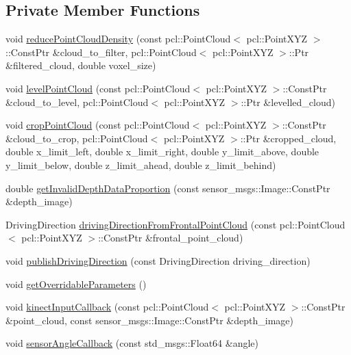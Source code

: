 \subsection*{\-Private \-Member \-Functions}
\begin{DoxyCompactItemize}
\item 
void \hyperlink{class_r_p_obstacle_avoidance_node_ae8af3d8cee91dae5e0c22c6ae1f29533}{reduce\-Point\-Cloud\-Density} (const pcl\-::\-Point\-Cloud$<$ pcl\-::\-Point\-X\-Y\-Z $>$\-::\-Const\-Ptr \&cloud\-\_\-to\-\_\-filter, pcl\-::\-Point\-Cloud$<$ pcl\-::\-Point\-X\-Y\-Z $>$\-::\-Ptr \&filtered\-\_\-cloud, double voxel\-\_\-size)
\item 
void \hyperlink{class_r_p_obstacle_avoidance_node_a92820408bb828c8361dd194b74f53202}{level\-Point\-Cloud} (const pcl\-::\-Point\-Cloud$<$ pcl\-::\-Point\-X\-Y\-Z $>$\-::\-Const\-Ptr \&cloud\-\_\-to\-\_\-level, pcl\-::\-Point\-Cloud$<$ pcl\-::\-Point\-X\-Y\-Z $>$\-::\-Ptr \&levelled\-\_\-cloud)
\item 
void \hyperlink{class_r_p_obstacle_avoidance_node_a07f936f129797f6651a8cbb94201e64d}{crop\-Point\-Cloud} (const pcl\-::\-Point\-Cloud$<$ pcl\-::\-Point\-X\-Y\-Z $>$\-::\-Const\-Ptr \&cloud\-\_\-to\-\_\-crop, pcl\-::\-Point\-Cloud$<$ pcl\-::\-Point\-X\-Y\-Z $>$\-::\-Ptr \&cropped\-\_\-cloud, double x\-\_\-limit\-\_\-left, double x\-\_\-limit\-\_\-right, double y\-\_\-limit\-\_\-above, double y\-\_\-limit\-\_\-below, double z\-\_\-limit\-\_\-ahead, double z\-\_\-limit\-\_\-behind)
\item 
double \hyperlink{class_r_p_obstacle_avoidance_node_acd37a3e07562bdb791f18c113f45fbd8}{get\-Invalid\-Depth\-Data\-Proportion} (const sensor\-\_\-msgs\-::\-Image\-::\-Const\-Ptr \&depth\-\_\-image)
\item 
\-Driving\-Direction \hyperlink{class_r_p_obstacle_avoidance_node_aa7f8e2b5949c3d6af800a80dfe3fc488}{driving\-Direction\-From\-Frontal\-Point\-Cloud} (const pcl\-::\-Point\-Cloud$<$ pcl\-::\-Point\-X\-Y\-Z $>$\-::\-Const\-Ptr \&frontal\-\_\-point\-\_\-cloud)
\item 
void \hyperlink{class_r_p_obstacle_avoidance_node_a8655bb559bb1482da40bbc2ed08b07a0}{publish\-Driving\-Direction} (const \-Driving\-Direction driving\-\_\-direction)
\item 
void \hyperlink{class_r_p_obstacle_avoidance_node_a2fb24e8a160ef9fed4813ca712c0fef0}{get\-Overridable\-Parameters} ()
\item 
void \hyperlink{class_r_p_obstacle_avoidance_node_a0df3266495f63da9a7d1069b1708986e}{kinect\-Input\-Callback} (const pcl\-::\-Point\-Cloud$<$ pcl\-::\-Point\-X\-Y\-Z $>$\-::\-Const\-Ptr \&point\-\_\-cloud, const sensor\-\_\-msgs\-::\-Image\-::\-Const\-Ptr \&depth\-\_\-image)
\item 
void \hyperlink{class_r_p_obstacle_avoidance_node_a3cee49031b7590781f3654ace7de9be7}{sensor\-Angle\-Callback} (const std\-\_\-msgs\-::\-Float64 \&angle)
\end{DoxyCompactItemize}
